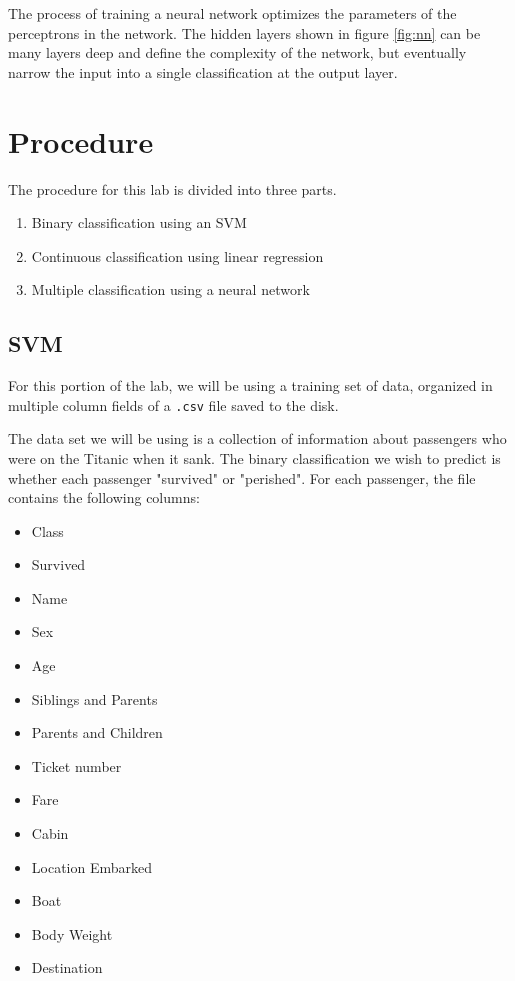 \documentclass[11pt,a4paper]{article}
\begin{document}
The process of training a neural network optimizes the parameters of the perceptrons in the network. The hidden layers shown in figure \ref{fig:nn} can be many layers deep and define the complexity of the network, but eventually narrow the input into a single classification at the output layer.

\section{Procedure}
The procedure for this lab is divided into three parts.

\begin{enumerate}
\item Binary classification using an SVM
\item Continuous classification using linear regression
\item Multiple classification using a neural network
\end{enumerate}

\subsection{SVM}
For this portion of the lab, we will be using a training set of data, organized in multiple column fields of a \verb|.csv| file saved to the disk. 

The data set we will be using is a collection of information about passengers who were on the Titanic when it sank. The binary classification we wish to predict is whether each passenger "survived" or "perished". For each passenger, the file contains the following columns:

\begin{itemize}
\item Class
\item Survived
\item Name
\item Sex
\item Age
\item Siblings and Parents
\item Parents and Children
\item Ticket number
\item Fare
\item Cabin
\item Location Embarked
\item Boat
\item Body Weight
\item Destination
\end{itemize}
\end{document}
